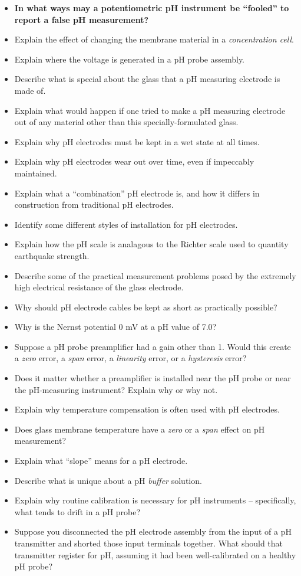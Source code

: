 \begin{itemize}
\item{} {\bf In what ways may a potentiometric pH instrument be ``fooled'' to report a false pH measurement?}
\item{} Explain the effect of changing the membrane material in a {\it concentration cell}.
\item{} Explain where the voltage is generated in a pH probe assembly.
\item{} Describe what is special about the glass that a pH measuring electrode is made of.
\item{} Explain what would happen if one tried to make a pH measuring electrode out of any material other than this specially-formulated glass.
\item{} Explain why pH electrodes must be kept in a wet state at all times.
\item{} Explain why pH electrodes wear out over time, even if impeccably maintained.
\item{} Explain what a ``combination'' pH electrode is, and how it differs in construction from traditional pH electrodes.
\item{} Identify some different styles of installation for pH electrodes.
\item{} Explain how the pH scale is analagous to the Richter scale used to quantity earthquake strength.
\item{} Describe some of the practical measurement problems posed by the extremely high electrical resistance of the glass electrode.
\item{} Why should pH electrode cables be kept as short as practically possible?
\item{} Why is the Nernst potential 0 mV at a pH value of 7.0?
\item{} Suppose a pH probe preamplifier had a gain other than 1.  Would this create a {\it zero} error, a {\it span} error, a {\it linearity} error, or a {\it hysteresis} error?
\item{} Does it matter whether a preamplifier is installed near the pH probe or near the pH-measuring instrument?  Explain why or why not.
\item{} Explain why temperature compensation is often used with pH electrodes.
\item{} Does glass membrane temperature have a {\it zero} or a {\it span} effect on pH measurement?
\item{} Explain what ``slope'' means for a pH electrode.
\item{} Describe what is unique about a pH {\it buffer} solution.
\item{} Explain why routine calibration is necessary for pH instruments -- specifically, what tends to drift in a pH probe?
\item{} Suppose you disconnected the pH electrode assembly from the input of a pH transmitter and shorted those input terminals together.  What should that transmitter register for pH, assuming it had been well-calibrated on a healthy pH probe?
\end{itemize}






